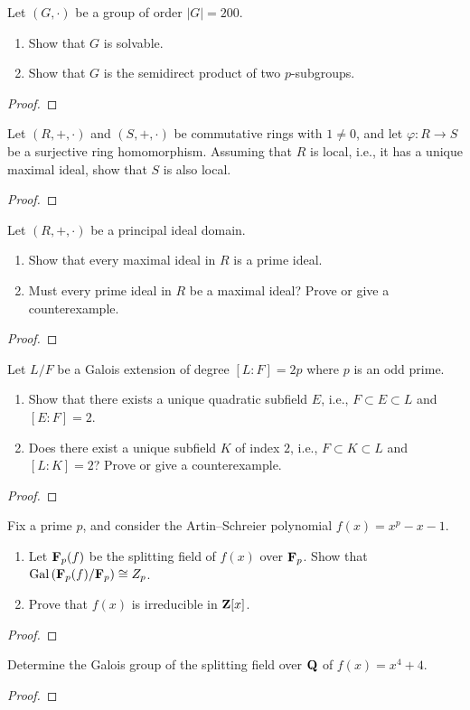 \begin{problem}
Let $(G,\cdot)$ be a group of order $|G|=200$.
\begin{enumerate}[noitemsep,label=(\alph*)]
\item Show that $G$ is solvable.
\item Show that $G$ is the semidirect product of two $p$-subgroups.
\end{enumerate}
\end{problem}
\begin{proof}
\end{proof}
\begin{problem}
Let $(R,+,\cdot)$ and $(S,+,\cdot)$ be commutative rings with $1\neq 0$,
and let $\varphi\colon R\to S$ be a surjective ring homomorphism. Assuming
that $R$ is local, i.e., it has a unique maximal ideal, show that $S$ is
also local.
\end{problem}
\begin{proof}
\end{proof}
\begin{problem}
Let $(R,+,\cdot)$ be a principal ideal domain.
\begin{enumerate}[noitemsep,label=(\alph*)]
\item Show that every maximal ideal in $R$ is a prime ideal.
\item Must every prime ideal in $R$ be a maximal ideal? Prove or give a
  counterexample.
\end{enumerate}
\end{problem}
\begin{proof}
\end{proof}
\begin{problem}
Let $L/F$ be a Galois extension of degree $[L:F]=2p$ where $p$ is an odd
prime.
\begin{enumerate}[noitemsep,label=(\alph*)]
\item Show that there exists a unique quadratic subfield $E$, i.e.,
  $F\subset E\subset L$ and $[E:F]=2$.
\item Does there exist a unique subfield $K$ of index $2$, i.e., $F\subset
  K\subset L$ and $[L:K]=2$? Prove or give a counterexample.
\end{enumerate}
\end{problem}
\begin{proof}
\end{proof}
\begin{problem}
Fix a prime $p$, and consider the Artin--Schreier polynomial
$f(x)=x^p-x-1$.
\begin{enumerate}[noitemsep,label=(\alph*)]
\item Let $\mathbf{F}_p(f)$ be the splitting field of $f(x)$ over $\mathbf{F}_p$. Show
  that $\operatorname{Gal}\left(\mathbf{F}_p(f)/\mathbf{F}_p\right)\cong Z_p$.
\item Prove that $f(x)$ is irreducible in $\mathbf{Z}[x]$.
\end{enumerate}
\end{problem}
\begin{proof}
\end{proof}
\begin{problem}
Determine the Galois group of the splitting field over $\mathbf{Q}$ of
$f(x)=x^4+4$.
\end{problem}
\begin{proof}
\end{proof}



